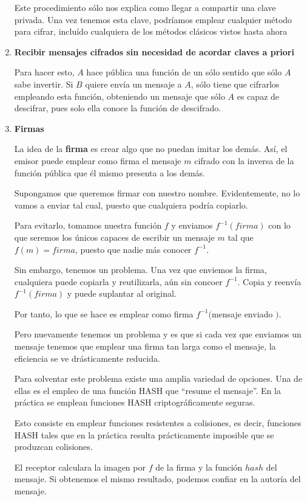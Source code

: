 \begin{enumerate}
Este procedimiento sólo nos explica como llegar a compartir una clave privada. Una vez tenemos esta clave, podríamos emplear cualquier método para cifrar, incluído cualquiera de los métodos clásicos vistos hasta ahora


\item \textbf{Recibir mensajes cifrados sin necesidad de acordar claves a priori}

Para hacer esto, $A$ hace pública una función de un sólo sentido que sólo $A$ sabe invertir. Si $B$ quiere envía un mensaje a $A$, sólo tiene que cifrarlos empleando esta función, obteniendo un mensaje que sólo $A$ es capaz de descifrar, pues solo ella conoce la función de descifrado.

\item \textbf{Firmas}

La idea de la \textbf{firma} es crear algo que no puedan imitar los demás. Así, el emisor puede emplear como firma el mensaje $m$ cifrado con la inversa de la función pública que él mismo presenta a los demás.

Supongamos que queremos firmar con nuestro nombre. Evidentemente, no lo vamos a enviar tal cual, puesto que cualquiera podría copiarlo.

Para evitarlo, tomamos nuestra función $f$ y enviamos $f^{-1}(firma)$ con lo que seremos los únicos capaces de escribir un mensaje $m$ tal que $f(m)=firma$, puesto que nadie más conocer $f^{-1}$.

Sin embargo, tenemos un problema. Una vez que enviemos la firma, cualquiera puede copiarla y reutilizarla, aún sin concoer $f^{-1}$. Copia y reenvía $f^{-1}(firma)$ y puede suplantar al original.

Por tanto, lo que se hace es emplear como firma $f^{-1}($mensaje enviado $)$.

Pero nuevamente tenemos un problema y es que si cada vez que enviamos un mensaje tenemos que emplear una firma tan larga como el mensaje, la eficiencia se ve drásticamente reducida.

Para solventar este problema existe una amplia variedad de opciones. Una de ellas es el empleo de una función HASH que ``resume el mensaje''. En la práctica se emplean funciones HASH criptográficamente seguras.

Esto consiste en emplear funciones resistentes a colisiones, es decir, funciones HASH tales que en la práctica resulta prácticamente imposible que se produzcan colisiones.

\begin{remark}
El receptor calculara la imagen por $f$ de la firma y la función $hash$ del mensaje. Si obtenemos el mismo resultado, podemos confiar en la autoría del mensaje.
\end{remark}


\end{enumerate}
